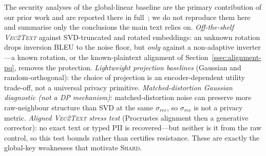 \documentclass[11pt,a4paper]{article}
\begin{document}
The security analyses of the global-linear baseline are the primary
contribution of our prior work and are reported there in
full~\cite{ref_vkit,ref_alpha}; we do not reproduce them here and summarise
only the conclusions the main text relies on. \emph{Off-the-shelf
\textsc{Vec2Text}} against SVD-truncated and rotated embeddings: an unknown
rotation drops inversion BLEU to the noise floor, but \emph{only} against a
non-adaptive inverter---a known rotation, or the known-plaintext alignment
of Section~\ref{ssec:alignment-pq}, removes the protection.
\emph{Lightweight projection baselines} (Gaussian and random-orthogonal):
the choice of projection is an encoder-dependent utility trade-off, not a
universal privacy primitive. \emph{Matched-distortion Gaussian diagnostic
(not a DP mechanism)}:
matched-distortion noise can preserve more raw-neighbour structure than SVD
at the same $\sigma_{rec}$, so $\sigma_{rec}$ is not a privacy metric.
\emph{Aligned \textsc{Vec2Text} stress test} (Procrustes alignment then a
generative corrector): no exact text or typed PII is recovered---but neither
is it from the raw control, so this test bounds rather than certifies
resistance. These are exactly the global-key weaknesses that motivate
\textsc{Shard}.
\end{document}
